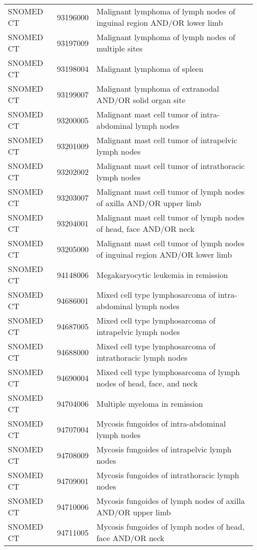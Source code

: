 \begin{longtable}{p{}p{}p{}}
  SNOMED CT & 93196000 & Malignant lymphoma of lymph nodes of inguinal region AND/OR lower limb \\ 
  SNOMED CT & 93197009 & Malignant lymphoma of lymph nodes of multiple sites \\ 
  SNOMED CT & 93198004 & Malignant lymphoma of spleen \\ 
  SNOMED CT & 93199007 & Malignant lymphoma of extranodal AND/OR solid organ site \\ 
  SNOMED CT & 93200005 & Malignant mast cell tumor of intra-abdominal lymph nodes \\ 
  SNOMED CT & 93201009 & Malignant mast cell tumor of intrapelvic lymph nodes \\ 
  SNOMED CT & 93202002 & Malignant mast cell tumor of intrathoracic lymph nodes \\ 
  SNOMED CT & 93203007 & Malignant mast cell tumor of lymph nodes of axilla AND/OR upper limb \\ 
  SNOMED CT & 93204001 & Malignant mast cell tumor of lymph nodes of head, face AND/OR neck \\ 
  SNOMED CT & 93205000 & Malignant mast cell tumor of lymph nodes of inguinal region AND/OR lower limb \\ 
  SNOMED CT & 94148006 & Megakaryocytic leukemia in remission \\ 
  SNOMED CT & 94686001 & Mixed cell type lymphosarcoma of intra-abdominal lymph nodes \\ 
  SNOMED CT & 94687005 & Mixed cell type lymphosarcoma of intrapelvic lymph nodes \\ 
  SNOMED CT & 94688000 & Mixed cell type lymphosarcoma of intrathoracic lymph nodes \\ 
  SNOMED CT & 94690004 & Mixed cell type lymphosarcoma of lymph nodes of head, face, and neck \\ 
  SNOMED CT & 94704006 & Multiple myeloma in remission \\ 
  SNOMED CT & 94707004 & Mycosis fungoides of intra-abdominal lymph nodes \\ 
  SNOMED CT & 94708009 & Mycosis fungoides of intrapelvic lymph nodes \\ 
  SNOMED CT & 94709001 & Mycosis fungoides of intrathoracic lymph nodes \\ 
  SNOMED CT & 94710006 & Mycosis fungoides of lymph nodes of axilla AND/OR upper limb \\ 
  SNOMED CT & 94711005 & Mycosis fungoides of lymph nodes of head, face AND/OR neck \\ 

\end{longtable}
